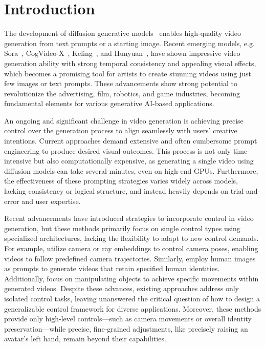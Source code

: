 \section{Introduction}

The development of diffusion generative models~\cite{rombach2022high,ho2020denoising,blattmann2023stable,brooks2024video,lin2024open,opensora} enables high-quality video generation from text prompts or a starting image. Recent emerging models, e.g. Sora~\cite{brooks2024video}, CogVideo-X~\cite{yang2024cogvideox}, Keling~\cite{keling}, and Hunyuan~\cite{kong2024hunyuanvideo}, have shown impressive video generation ability with strong temporal consistency and appealing visual effects, which becomes a promising tool for artists to create stunning videos using just few images or text prompts. These advancements show strong potential to revolutionize the advertising, film, robotics, and game industries, becoming fundamental elements for various generative AI-based applications.

An ongoing and significant challenge in video generation is achieving precise control over the generation process to align seamlessly with users' creative intentions. Current approaches demand extensive and often cumbersome prompt engineering to produce desired visual outcomes. This process is not only time-intensive but also computationally expensive, as generating a single video using diffusion models can take several minutes, even on high-end GPUs. Furthermore, the effectiveness of these prompting strategies varies widely across models, lacking consistency or logical structure, and instead heavily depends on trial-and-error and user expertise.


Recent advancements have introduced strategies to incorporate control in video generation, but these methods primarily focus on single control types using specialized architectures, lacking the flexibility to adapt to new control demands. For example, \cite{wang2024motionctrl,he2024cameractrl} utilize camera or ray embeddings to control camera poses, enabling videos to follow predefined camera trajectories. Similarly, \cite{polyak2024movie,he2024id,yuan2024identity} employ human images as prompts to generate videos that retain specified human identities. Additionally, \cite{wang2024boximator,huang2023fine,guo2024sparsectrl,namekata2024sg,ma2024trailblazer,ma2024follow} focus on manipulating objects to achieve specific movements within generated videos. Despite these advances, existing approaches address only isolated control tasks, leaving unanswered the critical question of how to design a generalizable control framework for diverse applications. Moreover, these methods provide only high-level controls—such as camera movements or overall identity preservation—while precise, fine-grained adjustments, like precisely raising an avatar's left hand, remain beyond their capabilities.

